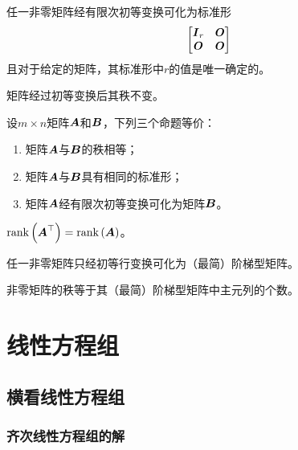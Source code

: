 \documentclass{ctexart}
\begin{document}
\begin{theorem}
    任一非零矩阵经有限次初等变换可化为标准形
    \begin{equation*}
        \begin{bmatrix}
            \boldsymbol{I}_r & \boldsymbol{O} \\\boldsymbol{O}&\boldsymbol{O}
        \end{bmatrix}
    \end{equation*}
    且对于给定的矩阵，其标准形中\(r\)的值是唯一确定的。
\end{theorem}

\begin{infer}
    矩阵经过初等变换后其秩不变。
\end{infer}

\begin{theorem}
    设\(m\times n\)矩阵\(\boldsymbol{A}\)和\(\boldsymbol{B}\)，下列三个命题等价：
    \begin{enumerate}
        \item 矩阵\(\boldsymbol{A}\)与\(\boldsymbol{B}\)的秩相等；
        \item 矩阵\(\boldsymbol{A}\)与\(\boldsymbol{B}\)具有相同的标准形；
        \item 矩阵\(\boldsymbol{A}\)经有限次初等变换可化为矩阵\(\boldsymbol{B}\)。
    \end{enumerate}
\end{theorem}

\begin{theorem}
    \(\mathrm{rank}\left( \boldsymbol{A}^\top \right)=\mathrm{rank}\left( \boldsymbol{A} \right)\)。
\end{theorem}

\begin{theorem}
    任一非零矩阵只经初等行变换可化为（最简）阶梯型矩阵。
\end{theorem}

\begin{infer}
    非零矩阵的秩等于其（最简）阶梯型矩阵中主元列的个数。
\end{infer}

\clearpage

\section{线性方程组}

\subsection{横看线性方程组}

\subsubsection*{齐次线性方程组的解}
\end{document}
